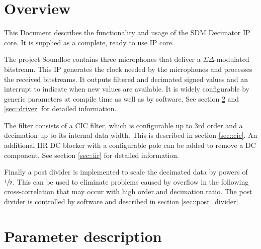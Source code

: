 


\maketitle


\section{Overview}
\label{sec:overview}

This Document describes the functionality and usage of the SDM Decimator IP core.
It is supplied as a complete, ready to use IP core.

The project Soundloc contains three microphones that deliver a $\Sigma\Delta$-modulated bitstream.
This IP generates the clock needed by the microphones and processes the received bitstreams.
It outputs filtered and decimated signed values and an interrupt to indicate when new values are available.
It is widely configurable by generic parameters at compile time as well as by software.
See section \ref{sec::parameters} and \ref{sec::driver} for detailed information.

The filter consists of a CIC filter, which is configurable up to 3rd order and a decimation up to its internal data width.
This is described in section \ref{sec::cic}.
An additional IIR DC blocker with a configurable pole can be added to remove a DC component. 
See section \ref{sec::iir} for detailed information.

Finally a post divider is implemented to scale the decimated data by powers of $\sfrac{1}{2}$.
This can be used to eliminate problems caused by overflow in the following cross-correlation that may occur with high order and decimation ratio.
The post divider is controlled by software and described in section \ref{sec::post_divider}.

\section{Parameter description}
\label{sec::parameters}

